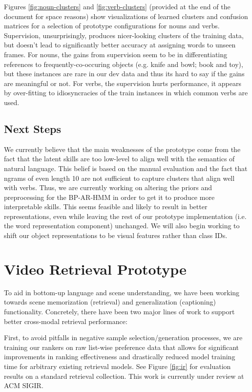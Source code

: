 \documentclass[11pt]{article}
\begin{document}
Figures \ref{fig:noun-clusters} and \ref{fig:verb-clusters} (provided at the end of the document for space reasons) show visualizations of learned clusters and confusion matrices for a selection of prototype configurations for nouns and verbs. Supervision, unsurprisingly, produces nicer-looking clusters of the training data, but doesn't lead to significantly better accuracy at assigning words to unseen frames. For nouns,  the gains from supervision seem to be in differentiating references to frequently-co-occuring objects (e.g. knife and bowl; book and toy), but these instances are rare in our dev data and thus its hard to say if the gains are meaningful or not. For verbs, the supervision hurts performance, it appears by over-fitting to idiosyncracies of the train instances in which common verbs are used.

\subsection{Next Steps}
\label{sec:nextsteps}

We currently believe that the main weaknesses of the prototype come from the fact that the latent skills are too low-level to align well with the semantics of natural language. This belief is based on the manual evaluation and the fact that ngrams of even length 10 are not sufficient to capture clusters that align well with verbs. Thus, we are currently working on altering the priors and preprocessing for the BP-AR-HMM in order to get it to produce more interpretable skills. This seems feasible and likely to result in better representations, even while leaving the rest of our prototype implementation (i.e. the word representation component) unchanged. We will also begin working to shift our object representations to be visual features rather than class IDs.

\section{Video Retrieval Prototype} 
\label{sec:ir}

To aid in bottom-up language and scene understanding, we have been working towards scene memorization (retrieval) and generalization (captioning) functionality. Concretely, there have been two major lines of work to support better cross-modal retrieval performance: 

First, to avoid pitfalls in negative sample selection/generation processes, we are training our rankers on raw list-wise preference data that allows for significant improvements in ranking effectiveness and drastically reduced model training time for arbitrary existing retrieval models. See Figure \ref{fig:ir} for evaluation results on a standard retrieval collection. This work is currently under review at ACM SIGIR.
\end{document}

